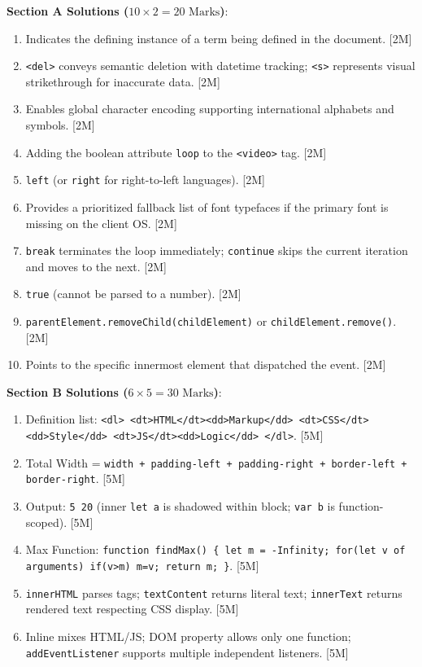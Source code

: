 \begin{solutionbox}
\noindent\textbf{Section A Solutions ($10 \times 2 = 20\text{ Marks}$)}:
\begin{enumerate}
    \item Indicates the defining instance of a term being defined in the document. [2M]
    \item \texttt{<del>} conveys semantic deletion with datetime tracking; \texttt{<s>} represents visual strikethrough for inaccurate data. [2M]
    \item Enables global character encoding supporting international alphabets and symbols. [2M]
    \item Adding the boolean attribute \texttt{loop} to the \texttt{<video>} tag. [2M]
    \item \texttt{left} (or \texttt{right} for right-to-left languages). [2M]
    \item Provides a prioritized fallback list of font typefaces if the primary font is missing on the client OS. [2M]
    \item \texttt{break} terminates the loop immediately; \texttt{continue} skips the current iteration and moves to the next. [2M]
    \item \texttt{true} (cannot be parsed to a number). [2M]
    \item \texttt{parentElement.removeChild(childElement)} or \texttt{childElement.remove()}. [2M]
    \item Points to the specific innermost element that dispatched the event. [2M]
\end{enumerate}

\medskip
\noindent\textbf{Section B Solutions ($6 \times 5 = 30\text{ Marks}$)}:
\begin{enumerate}[start=11]
    \item Definition list: \texttt{<dl> <dt>HTML</dt><dd>Markup</dd> <dt>CSS</dt><dd>Style</dd> <dt>JS</dt><dd>Logic</dd> </dl>}. [5M]
    \item Total Width = \texttt{width + padding-left + padding-right + border-left + border-right}. [5M]
    \item Output: \texttt{5 20} (inner \texttt{let a} is shadowed within block; \texttt{var b} is function-scoped). [5M]
    \item Max Function: \texttt{function findMax() \{ let m = -Infinity; for(let v of arguments) if(v>m) m=v; return m; \}}. [5M]
    \item \texttt{innerHTML} parses tags; \texttt{textContent} returns literal text; \texttt{innerText} returns rendered text respecting CSS display. [5M]
    \item Inline mixes HTML/JS; DOM property allows only one function; \texttt{addEventListener} supports multiple independent listeners. [5M]
\end{enumerate}


\end{solutionbox}
